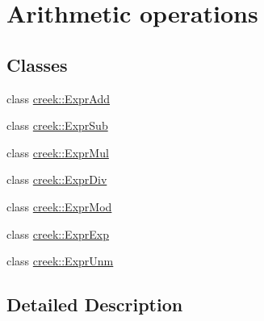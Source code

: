 \hypertarget{group__expression__arithmetic}{}\section{Arithmetic operations}
\label{group__expression__arithmetic}
\subsection*{Classes}
\begin{DoxyCompactItemize}
\item 
class \hyperlink{classcreek_1_1_expr_add}{creek\+::\+Expr\+Add}
\item 
class \hyperlink{classcreek_1_1_expr_sub}{creek\+::\+Expr\+Sub}
\item 
class \hyperlink{classcreek_1_1_expr_mul}{creek\+::\+Expr\+Mul}
\item 
class \hyperlink{classcreek_1_1_expr_div}{creek\+::\+Expr\+Div}
\item 
class \hyperlink{classcreek_1_1_expr_mod}{creek\+::\+Expr\+Mod}
\item 
class \hyperlink{classcreek_1_1_expr_exp}{creek\+::\+Expr\+Exp}
\item 
class \hyperlink{classcreek_1_1_expr_unm}{creek\+::\+Expr\+Unm}
\end{DoxyCompactItemize}


\subsection{Detailed Description}

